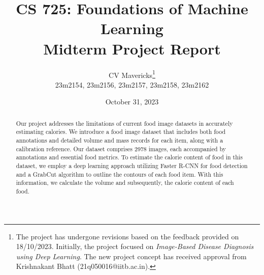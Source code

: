 \documentclass[12pt, a4paper, twoside]{article}
\title{\vspace{-0.5in}\textbf{CS 725: Foundations of Machine Learning \\
Midterm Project Report}}
\author{CV Mavericks\footnote{The project has undergone revisions based on the feedback provided on 18/10/2023. Initially, the project focused on \emph{Image-Based Disease Diagnosis using Deep Learning}. The new project concept has received approval from Krishnakant Bhatt (21q050016@iitb.ac.in).}\\
23m2154, 23m2156, 23m2157, 23m2158, 23m2162}
\date{October 31, 2023}
\begin{document}
\maketitle
\thispagestyle{fancy}

\begin{abstract}
Our project addresses the limitations of current food image datasets in accurately estimating calories. We introduce a food image dataset that includes both food annotations and detailed volume and mass records for each item, along with a calibration reference. Our dataset comprises 2978 images, each accompanied by annotations and essential food metrics. To estimate the calorie content of food in this dataset, we employ a deep learning approach utilizing Faster R-CNN for food detection and a GrabCut algorithm to outline the contours of each food item. With this information, we calculate the volume and subsequently, the calorie content of each food.
\end{abstract}
\end{document}
